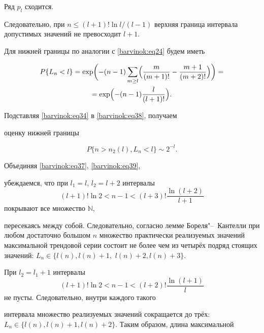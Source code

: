 Ряд $p_l$ сходится. 

Следовательно, при $n\le (l+1)! \ln l /({l-1})$ верхняя граница интервала допустимых значений не превосходит $l+1$. 

Для нижней границы по аналогии с \eqref{barvinok:eq24} будем иметь

\begin{multline}

\label{barvinok:eq38} P\{L_n <l\}=\exp \biggl(

-(n-1)\sum\limits_{m\ge l} \Bigl(

\frac{m}{(m+1)!}-\frac{m+1}{(m+2)!}\Bigr) \biggr)=\\

=\exp \Bigl( -(n-1)\frac{l}{(l+1)!}\Bigr).

\end{multline}

\pagebreak



\noindent

Подставляя \eqref{barvinok:eq34} в \eqref{barvinok:eq38}, получаем

оценку нижней границы

\begin{equation}

\label{barvinok:eq39} P\{ n>n_2 (l),L_n <l\}\sim {2^{-l}}.

\end{equation}

Объединяя \eqref{barvinok:eq37}, \eqref{barvinok:eq39},

убеждаемся, что при $l_1 =l$, $l_2 =l+2$ интервалы $$(l+1)!\ln 2

<n-1<(l+3)!\frac{\ln (l+2)}{l+1}$$ покрывают все множество $\mathbb N$,

пересекаясь между собой. Следовательно, согласно лемме Бореля"--~Кантелли при любом достаточно большом $n$ множество практически реализуемых значений максимальной трендовой серии состоит не более чем из четырёх подряд стоящих значений: $L_n \in \{ l(n), {l(n)+1},$ $ l(n)+2, l(n)+3\}$.



При $l_2 =l_1 +1$ интервалы $$(l+1)!\ln 2 <n-1<(l+2)!\frac{\ln

(l+1)}{l}$$ не пусты. Следовательно, внутри каждого такого

интервала множество реализуемых значений сокращается до трёх: $L_n

\in \{ l(n),l(n)+1,l(n)+2\}$. Таким образом, длина максимальной

